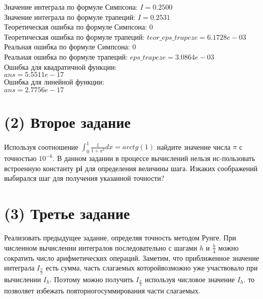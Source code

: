 Значение интеграла по формуле Симпсона: $I = 0.2500$\\
Значение интеграла по формуле трапеций: $I = 0.2531$\\
Теоретическая ошибка по формуле Симпсона: $0$\\
Теоретическая ошибка по формуле трапеций: $teor\_eps\_trapeze = 6.1728e-03$\\
Реальная ошибка по формуле Симпсона: $0$\\
Реальная ошибка по формуле трапеций: $eps\_trapeze = 3.0864e-03$\\
Ошибка для квадратичной функции:\\
$ans = 5.5511e-17$\\
Ошибка для линейной функции:\\
$ans = 2.7756e-17$\\

\section{(2) Второе задание}
Используя соотношение $\int_{0}^{1}\frac{1}{1+x^{2}}dx = arctg(1)$ найдите значение числа $\pi$ с точностью $10^{-6}$. В данном задании в процессе вычислений нельзя ис-пользовать встроенную константу \textbf{pi} для определения величины шага. Изкаких соображений выбирался шаг для получения указанной точности?

\section{(3) Третье задание}
Реализовать предыдущее задание, определяя точность методом Рунге. При численном вычислении интегралов последовательно с шагами $h$ и $\frac{h}{4}$ можно сократить число арифметических операций. Заметим, что приближенное значение интеграла $I_{\frac{h}{2}}$ есть сумма, часть слагаемых которойвозможно уже участвовало при вычислении $I_{h}$. Поэтому можно получить $I_{\frac{h}{2}}$ используя числовое значение $I_{h}$. то позволяет избежать повторногосуммирования части слагаемых.
